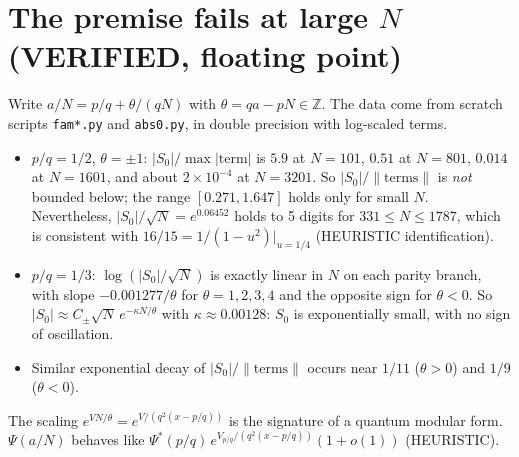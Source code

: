 \documentclass[11pt]{article}
\theoremstyle{remark}\newtheorem{remark}[lemma]{Remark}
\begin{document}
\section{The premise fails at large $N$ (VERIFIED, floating point)}
Write $a/N=p/q+\theta/(qN)$ with $\theta=qa-pN\in\mathbb Z$. The data come from scratch scripts \texttt{fam*.py} and \texttt{abs0.py}, in double precision with log-scaled terms.
\begin{itemize}
\item $p/q=1/2$, $\theta=\pm1$: $|S_0|/\max|\text{term}|$ is $5.9$ at $N=101$, $0.51$ at $N=801$, $0.014$ at $N=1601$, and about $2\times10^{-4}$ at $N=3201$. So $|S_0|/\|\text{terms}\|$ is \emph{not} bounded below; the range $[0.271,1.647]$ holds only for small $N$. Nevertheless, $|S_0|/\sqrt N=e^{0.06452}$ holds to 5 digits for $331\le N\le1787$, which is consistent with $16/15=1/(1-u^2)|_{u=1/4}$ (HEURISTIC identification).
\item $p/q=1/3$: $\log(|S_0|/\sqrt N)$ is exactly linear in $N$ on each parity branch, with slope $-0.001277/\theta$ for $\theta=1,2,3,4$ and the opposite sign for $\theta<0$. So $|S_0|\approx C_\pm\sqrt N\,e^{-\kappa N/\theta}$ with $\kappa\approx0.00128$: $S_0$ is exponentially small, with no sign of oscillation.
\item Similar exponential decay of $|S_0|/\|\text{terms}\|$ occurs near $1/11$ ($\theta>0$) and $1/9$ ($\theta<0$).
\end{itemize}
The scaling $e^{V N/\theta}=e^{V/(q^2(x-p/q))}$ is the signature of a quantum modular form. $\Psi(a/N)$ behaves like $\Psi^*(p/q)\,e^{V_{p/q}/(q^2(x-p/q))}(1+o(1))$ (HEURISTIC).
\end{document}
